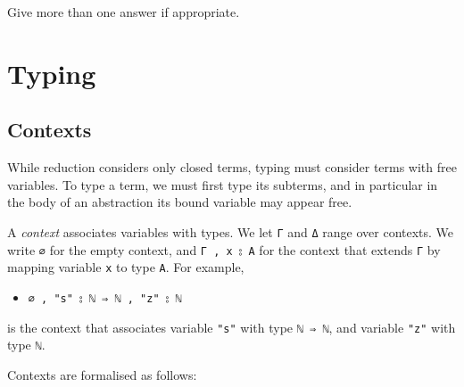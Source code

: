 \begin{itemize}
  Give more than one answer if appropriate.
\end{itemize}

\hypertarget{typing}{%
\section{Typing}\label{typing}}

\hypertarget{contexts}{%
\subsection{Contexts}\label{contexts}}

While reduction considers only closed terms, typing must consider terms
with free variables. To type a term, we must first type its subterms,
and in particular in the body of an abstraction its bound variable may
appear free.

A \emph{context} associates variables with types. We let \texttt{Γ} and
\texttt{Δ} range over contexts. We write \texttt{∅} for the empty
context, and \texttt{Γ\ ,\ x\ ⦂\ A} for the context that extends
\texttt{Γ} by mapping variable \texttt{x} to type \texttt{A}. For
example,

\begin{itemize}
\tightlist
\item
  \texttt{∅\ ,\ "s"\ ⦂\ \textasciigrave{}ℕ\ ⇒\ \textasciigrave{}ℕ\ ,\ "z"\ ⦂\ \textasciigrave{}ℕ}
\end{itemize}

is the context that associates variable \texttt{"s"} with type
\texttt{\textasciigrave{}ℕ\ ⇒\ \textasciigrave{}ℕ}, and variable
\texttt{"z"} with type \texttt{\textasciigrave{}ℕ}.

Contexts are formalised as follows:

\begin{fence}
\begin{code}%
\>[0]\AgdaSpace{}%
%
\>[10]\<%
\\
%
\\[\AgdaEmptyExtraSkip]%
\>[0]\AgdaSpace{}%
\AgdaSpace{}%
\AgdaSymbol{:}\AgdaSpace{}%
\AgdaSpace{}%
\<%
\\
\>[0][@{}l@{\AgdaIndent{0}}]%
\>[2]%
\>[8]\AgdaSymbol{:}\AgdaSpace{}%
\<%
\\
%
\>[2]\AgdaSpace{}%
\AgdaSymbol{:}\AgdaSpace{}%
\AgdaSpace{}%
\AgdaSpace{}%
\AgdaSpace{}%
\AgdaSpace{}%
\AgdaSpace{}%
\AgdaSpace{}%
\<%
\end{code}
\end{fence}

